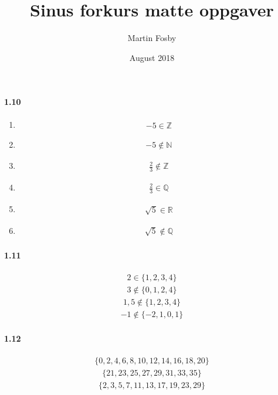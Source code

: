 \documentclass{article}
\title{Sinus forkurs matte oppgaver}
\author{Martin Fosby}
\date{August 2018}
\newcommand{\Z}{\mathbb{Z}}
\newcommand{\N}{\mathbb{N}}
\newcommand{\Q}{\mathbb{Q}}
\newcommand{\R}{\mathbb{R}}
\newcommand\litem[1]{\item{\bfseries#1\space}}
\begin{document}
\maketitle
{}

\paragraph{1.10}
\begin{enumerate}[label=\emph{\alph*})]
\litem{
  \begin{align*}
    -5 \in \Z
  \end{align*}
  }
\litem{
  \begin{align*}
   -5 \notin \N
  \end{align*}
  }
\litem{
\begin{align*}
   \frac{2}{3} \notin \Z
\end{align*}
}
\litem{
\begin{align*}
  \frac{2}{3} \in \Q
\end{align*}
}
\litem{
\begin{align*}
  \sqrt{5} \in \R
\end{align*}
}
\litem{
\begin{align*}
  \sqrt{5} \notin \Q
\end{align*}
}
\end{enumerate}

\paragraph{1.11}
\begin{align*}
  2 \in \{1,2,3,4\}
\end{align*}
\begin{align*}
  3 \notin \{0,1,2,4\}
\end{align*}
\begin{align*}
  1,5 \notin \{1,2,3,4\}
\end{align*}
\begin{align*}
  -1 \notin \{-2,1,0,1\}
\end{align*}

\paragraph{1.12}
\begin{align*}
  \{0,2,4,6,8,10,12,14,16,18,20\}
\end{align*}
\begin{align*}
  \{21,23,25,27,29,31,33,35\}
\end{align*}
\begin{align*}
  \{2,3,5,7,11,13,17,19,23,29\}
\end{align*}
\end{document}
